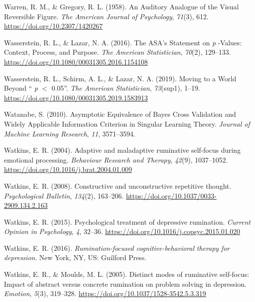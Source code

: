 \documentclass[a4paper,12pt,twoside,openright,oldfontcommands,final]{memoir}
\begin{document}
\leavevmode\hypertarget{ref-warren_auditory_1958}{}%
Warren, R. M., \& Gregory, R. L. (1958). An Auditory Analogue of the Visual Reversible Figure. \emph{The American Journal of Psychology}, \emph{71}(3), 612. \url{https://doi.org/10.2307/1420267}

\leavevmode\hypertarget{ref-wasserstein_asas_2016}{}%
Wasserstein, R. L., \& Lazar, N. A. (2016). The ASA's Statement on \emph{p} -Values: Context, Process, and Purpose. \emph{The American Statistician}, \emph{70}(2), 129--133. \url{https://doi.org/10.1080/00031305.2016.1154108}

\leavevmode\hypertarget{ref-wasserstein_moving_2019}{}%
Wasserstein, R. L., Schirm, A. L., \& Lazar, N. A. (2019). Moving to a World Beyond `` \emph{p} \(<\) 0.05''. \emph{The American Statistician}, \emph{73}(sup1), 1--19. \url{https://doi.org/10.1080/00031305.2019.1583913}

\leavevmode\hypertarget{ref-watanabe_asymptotic_2010}{}%
Watanabe, S. (2010). Asymptotic Equivalence of Bayes Cross Validation and Widely Applicable Information Criterion in Singular Learning Theory. \emph{Journal of Machine Learning Research}, \emph{11}, 3571--3594.

\leavevmode\hypertarget{ref-watkins_adaptive_2004}{}%
Watkins, E. R. (2004). Adaptive and maladaptive ruminative self-focus during emotional processing. \emph{Behaviour Research and Therapy}, \emph{42}(9), 1037--1052. \url{https://doi.org/10.1016/j.brat.2004.01.009}

\leavevmode\hypertarget{ref-Watkins2008}{}%
Watkins, E. R. (2008). Constructive and unconstructive repetitive thought. \emph{Psychological Bulletin}, \emph{134}(2), 163--206. \url{https://doi.org/10.1037/0033-2909.134.2.163}

\leavevmode\hypertarget{ref-watkins_psychological_2015}{}%
Watkins, E. R. (2015). Psychological treatment of depressive rumination. \emph{Current Opinion in Psychology}, \emph{4}, 32--36. \url{https://doi.org/10.1016/j.copsyc.2015.01.020}

\leavevmode\hypertarget{ref-watkins_rumination-focused_2016}{}%
Watkins, E. R. (2016). \emph{Rumination-focused cognitive-behavioral therapy for depression}. New York, NY, US: Guilford Press.

\leavevmode\hypertarget{ref-watkins_distinct_2005}{}%
Watkins, E. R., \& Moulds, M. L. (2005). Distinct modes of ruminative self-focus: Impact of abstract versus concrete rumination on problem solving in depression. \emph{Emotion}, \emph{5}(3), 319--328. \url{https://doi.org/10.1037/1528-3542.5.3.319}
\end{document}
